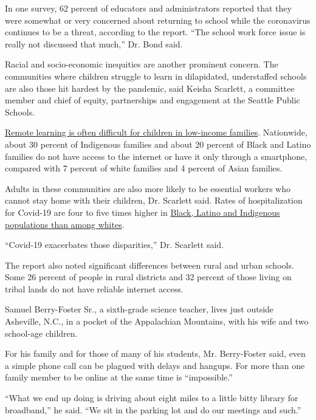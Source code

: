 In one survey, 62 percent of educators and administrators reported that
they were somewhat or very concerned about returning to school while the
coronavirus continues to be a threat, according to the report. ``The
school work force issue is really not discussed that much,'' Dr. Bond
said.

Racial and socio-economic inequities are another prominent concern. The
communities where children struggle to learn in dilapidated,
understaffed schools are also those hit hardest by the pandemic, said
Keisha Scarlett, a committee member and chief of equity, partnerships
and engagement at the Seattle Public Schools.

\href{https://www.nytimes3xbfgragh.onion/2020/04/06/us/coronavirus-schools-attendance-absent.html}{Remote
learning is often difficult for children in low-income families}.
Nationwide, about 30 percent of Indigenous families and about 20 percent
of Black and Latino families do not have access to the internet or have
it only through a smartphone, compared with 7 percent of white families
and 4 percent of Asian families.

Adults in these communities are also more likely to be essential workers
who cannot stay home with their children, Dr. Scarlett said. Rates of
hospitalization for Covid-19 are four to five times higher in
\href{https://www.nytimes3xbfgragh.onion/interactive/2020/07/05/us/coronavirus-latinos-african-americans-cdc-data.html}{Black,
Latino and Indigenous populations than among whites}.

``Covid-19 exacerbates those disparities,'' Dr. Scarlett said.

The report also noted significant differences between rural and urban
schools. Some 26 percent of people in rural districts and 32 percent of
those living on tribal lands do not have reliable internet access.

Samuel Berry-Foster Sr., a sixth-grade science teacher, lives just
outside Asheville, N.C., in a pocket of the Appalachian Mountains, with
his wife and two school-age children.

For his family and for those of many of his students, Mr. Berry-Foster
said, even a simple phone call can be plagued with delays and hangups.
For more than one family member to be online at the same time is
``impossible.''

``What we end up doing is driving about eight miles to a little bitty
library for broadband,'' he said. ``We sit in the parking lot and do our
meetings and such.''

